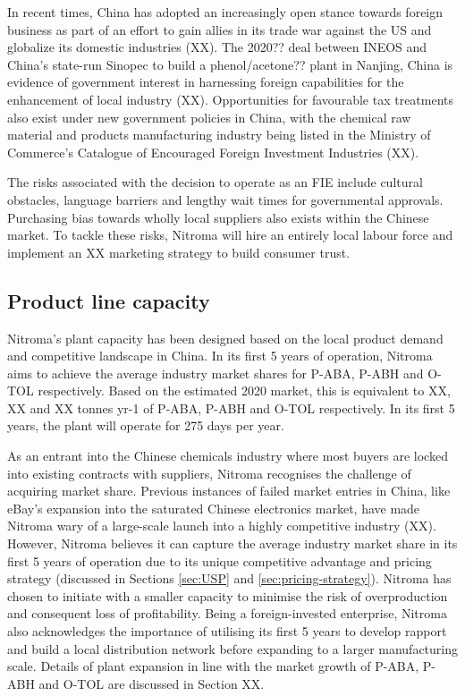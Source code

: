 In recent times, China has adopted an increasingly open stance towards foreign business as part of an effort to gain allies in its trade war against the US and globalize its domestic industries (XX). The 2020?? deal between INEOS and China’s state-run Sinopec to build a phenol/acetone?? plant in Nanjing, China is evidence of government interest in harnessing foreign capabilities for the enhancement of local industry (XX). Opportunities for favourable tax treatments also exist under new government policies in China, with the chemical raw material and products manufacturing industry being listed in the Ministry of Commerce’s Catalogue of Encouraged Foreign Investment Industries (XX). 

The risks associated with the decision to operate as an FIE include cultural obstacles, language barriers and lengthy wait times for governmental approvals. Purchasing bias towards wholly local suppliers also exists within the Chinese market. To tackle these risks, Nitroma will hire an entirely local labour force and implement an XX marketing strategy to build consumer trust.


\subsection{Product line capacity}
\label{sec:product-capacity}
Nitroma’s plant capacity has been designed based on the local product demand and competitive landscape in China. In its first 5 years of operation, Nitroma aims to achieve the average industry market shares for P-ABA, P-ABH and O-TOL respectively. Based on the estimated 2020 market, this is equivalent to XX, XX and XX tonnes yr-1 of P-ABA, P-ABH and O-TOL respectively. In its first 5 years, the plant will operate for 275 days per year.

As an entrant into the Chinese chemicals industry where most buyers are locked into existing contracts with suppliers, Nitroma recognises the challenge of acquiring market share. Previous instances of failed market entries in China, like eBay’s expansion into the saturated Chinese electronics market, have made Nitroma wary of a large-scale launch into a highly competitive industry (XX). However, Nitroma believes it can capture the average industry market share in its first 5 years of operation due to its unique competitive advantage and pricing strategy (discussed in Sections \ref{sec:USP} and \ref{sec:pricing-strategy}). Nitroma has chosen to initiate with a smaller capacity to minimise the risk of overproduction and consequent loss of profitability. Being a foreign-invested enterprise, Nitroma also acknowledges the importance of utilising its first 5 years to develop rapport and build a local distribution network before expanding to a larger manufacturing scale. Details of plant expansion in line with the market growth of P-ABA, P-ABH and O-TOL are discussed in Section XX.

